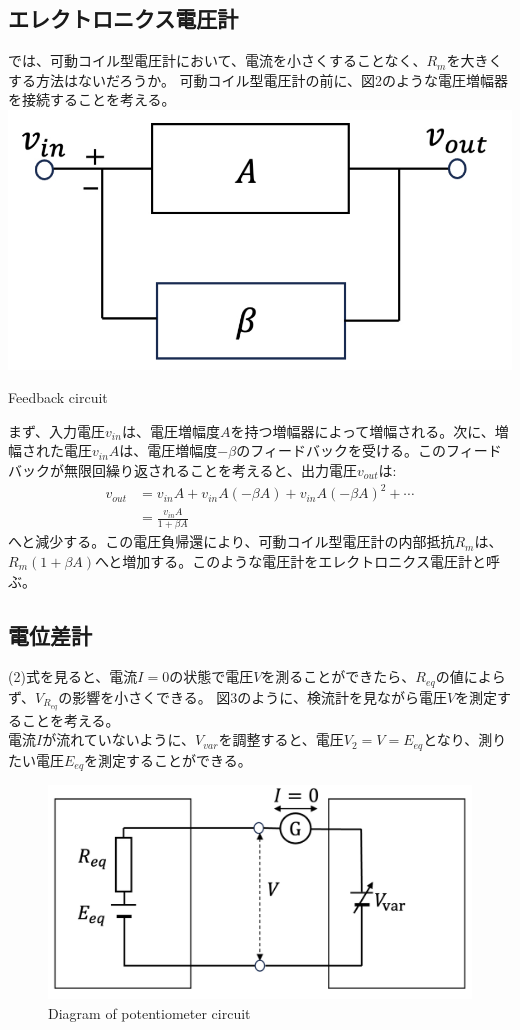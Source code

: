\documentclass[a4paper,10pt]{jsarticle}
\makeatletter
\newenvironment{figurehere}
{\def\@captype{figure}}
{}
\makeatother
\begin{document}
\begin{multicols}{2}
\subsection{エレクトロニクス電圧計}
では、可動コイル型電圧計において、電流を小さくすることなく、$R_m$を大きくする方法はないだろうか。
可動コイル型電圧計の前に、図2のような電圧増幅器を接続することを考える。\\

\begin{figurehere}
  \centering
  \includegraphics[width=0.6\linewidth]{figs/feedback.pdf}
  \caption{Feedback circuit}
  \label{fig:feedback}
\end{figurehere}


まず、入力電圧$v_{in}$は、電圧増幅度$A$を持つ増幅器によって増幅される。次に、増幅された電圧$v_{in}A$は、電圧増幅度$-\beta$のフィードバックを受ける。このフィードバックが無限回繰り返されることを考えると、出力電圧$v_{out}$は:
\begin{align*}
v_{out} &= v_{in}A + v_{in}A(-\beta A) + v_{in}A(-\beta A)^2 + \cdots \\
&= \frac{v_{in}A}{1+\beta A} 
\end{align*}
へと減少する。この電圧負帰還により、可動コイル型電圧計の内部抵抗$R_m$は、$R_m(1+\beta A)$へと増加する。このような電圧計をエレクトロニクス電圧計と呼ぶ。
\subsection{電位差計}
(2)式を見ると、電流$I = 0$の状態で電圧$V$を測ることができたら、$R_{eq}$の値によらず、$V_{R_{eq}}$の影響を小さくできる。
図3のように、検流計を見ながら電圧$V$を測定することを考える。\\
電流$I$が流れていないように、$V_{var}$を調整すると、電圧$V_2 = V = E_{eq}$となり、測りたい電圧$E_{eq}$を測定することができる。\\
\begin{figure}[H]
  \centering
  \includegraphics[width=0.8\linewidth]{figs/potentiometer.pdf}
  \caption{Diagram of potentiometer circuit}
  \label{fig:my_label}
\end{figure}

\end{multicols}
\end{document}
